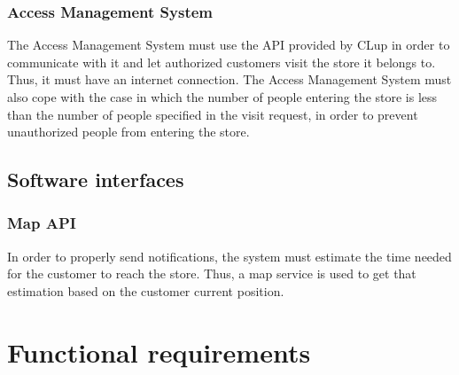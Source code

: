 \documentclass[a4paper,oneside,11pt]{book}   %
\begin{document}
    \subsubsection{Access Management System}
    The Access Management System must use the API provided by CLup in order to communicate with it and let authorized customers visit the store it belongs to. Thus, it must have an internet connection. The Access Management System must also cope with the case in which the number of people entering the store is less than the number of people specified in the visit request, in order to prevent unauthorized people from entering the store.
    
    \subsection{Software interfaces}
    \subsubsection{Map API}
    In order to properly send notifications, the system must estimate the time needed for the customer to reach the store. Thus, a map service is used to get that estimation based on the customer current position.
    \newpage
    \section{Functional requirements}
\end{document}
